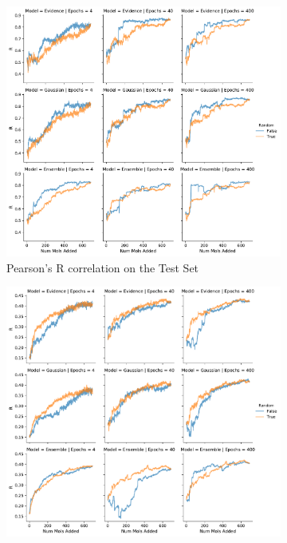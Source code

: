 \documentclass[journal=jmcmar,manuscript=article]{achemso}
\begin{document}
\begin{figure}[tbph]
    \centering
    \begin{subfigure}[b]{0.48\textwidth}
        \includegraphics[width=1\linewidth]{figures/fig9_morgan_fp_bylabel_R.pdf}
        \caption{Pearson's R correlation on the Test Set}
    \end{subfigure}%
    \hfill
    \begin{subfigure}[b]{0.48\textwidth}
        \includegraphics[width=1\linewidth]{figures/fig9_morgan_fp_bylabel_rest_R.pdf}

\end{subfigure}
\end{figure}
\end{document}
